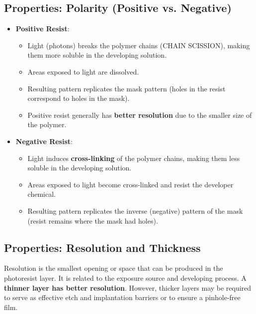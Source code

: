 \documentclass{report}
\begin{document}
\subsection{Properties: Polarity (Positive vs. Negative)}
\begin{itemize} 
    \item \textbf{Positive Resist}: 
    \begin{itemize} 
        \item Light (photons) breaks the polymer chains (CHAIN SCISSION), making them more soluble in the developing solution. 
        \item Areas exposed to light are dissolved. 
        \item Resulting pattern replicates the mask pattern (holes in the resist correspond to holes in the mask). 
        \item Positive resist generally has \textbf{better resolution} due to the smaller size of the polymer. 
    \end{itemize} 
    \item \textbf{Negative Resist}: 
    \begin{itemize} 
        \item Light induces \textbf{cross-linking} of the polymer chains, making them less soluble in the developing solution. 
        \item Areas exposed to light become cross-linked and resist the developer chemical. 
        \item Resulting pattern replicates the inverse (negative) pattern of the mask (resist remains where the mask had holes). 
    \end{itemize} 
\end{itemize}
\subsection{Properties: Resolution and Thickness} Resolution is the smallest opening or space that can be produced in the photoresist layer. It is related to the exposure source and developing process. A \textbf{thinner layer has better resolution}. However, thicker layers may be required to serve as effective etch and implantation barriers or to ensure a pinhole-free film.
\end{document}
